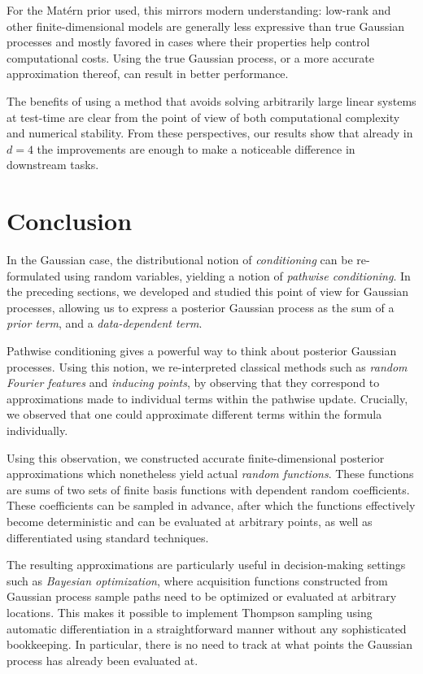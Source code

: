 \documentclass[11pt]{book}
\begin{document}
For the Matérn prior used, this mirrors modern understanding: low-rank and other finite-dimensional models are generally less expressive than true Gaussian processes and mostly favored in cases where their properties help control computational costs.
Using the true Gaussian process, or a more accurate approximation thereof, can result in better performance.

The benefits of using a method that avoids solving arbitrarily large linear systems at test-time are clear from the point of view of both computational complexity and numerical stability.
From these perspectives, our results show that already in $d=4$ the improvements are enough to make a noticeable difference in downstream tasks.


\section{Conclusion}

In the Gaussian case, the distributional notion of \emph{conditioning} can be re-formulated using random variables, yielding a notion of \emph{pathwise conditioning}.
In the preceding sections, we developed and studied this point of view for Gaussian processes, allowing us to express a posterior Gaussian process as the sum of a \emph{prior term}, and a \emph{data-dependent term}.

Pathwise conditioning gives a powerful way to think about posterior Gaussian processes.
Using this notion, we re-interpreted classical methods such as \emph{random Fourier features} and \emph{inducing points}, by observing that they correspond to approximations made to individual terms within the pathwise update.
Crucially, we observed that one could approximate different terms within the formula individually.

Using this observation, we constructed accurate finite-dimensional posterior approximations which nonetheless yield actual \emph{random functions}.
These functions are sums of two sets of finite basis functions with dependent random coefficients.
These coefficients can be sampled in advance, after which the functions effectively become deterministic and can be evaluated at arbitrary points, as well as differentiated using standard techniques.

The resulting approximations are particularly useful in decision-making settings such as \emph{Bayesian optimization}, where acquisition functions constructed from Gaussian process sample paths need to be optimized or evaluated at arbitrary locations.
This makes it possible to implement Thompson sampling using automatic differentiation in a straightforward manner without any sophisticated bookkeeping.
In particular, there is no need to track at what points the Gaussian process has already been evaluated at.
\end{document}
